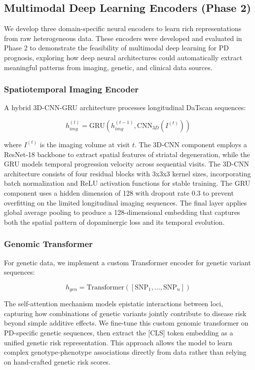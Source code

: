 \documentclass[journal,twoside,web]{ieeecolor}
\begin{document}
\subsection{Multimodal Deep Learning Encoders (Phase 2)}

We develop three domain-specific neural encoders to learn rich representations from raw heterogeneous data. These encoders were developed and evaluated in Phase 2 to demonstrate the feasibility of multimodal deep learning for PD prognosis, exploring how deep neural architectures could automatically extract meaningful patterns from imaging, genetic, and clinical data sources.

\subsubsection{Spatiotemporal Imaging Encoder}
A hybrid 3D-CNN-GRU architecture processes longitudinal DaTscan sequences:

\begin{equation}
h_{img}^{(t)} = \text{GRU}(h_{img}^{(t-1)}, \text{CNN}_{3D}(I^{(t)}))
\end{equation}

where $I^{(t)}$ is the imaging volume at visit $t$. The 3D-CNN component employs a ResNet-18 backbone to extract spatial features of striatal degeneration, while the GRU models temporal progression velocity across sequential visits. The 3D-CNN architecture consists of four residual blocks with 3x3x3 kernel sizes, incorporating batch normalization and ReLU activation functions for stable training. The GRU component uses a hidden dimension of 128 with dropout rate 0.3 to prevent overfitting on the limited longitudinal imaging sequences. The final layer applies global average pooling to produce a 128-dimensional embedding that captures both the spatial pattern of dopaminergic loss and its temporal evolution.

\subsubsection{Genomic Transformer}
For genetic data, we implement a custom Transformer encoder for genetic variant sequences:

\begin{equation}
h_{gen} = \text{Transformer}([\text{SNP}_1, \ldots, \text{SNP}_n])
\end{equation}

The self-attention mechanism models epistatic interactions between loci, capturing how combinations of genetic variants jointly contribute to disease risk beyond simple additive effects. We fine-tune this custom genomic transformer on PD-specific genetic sequences, then extract the [CLS] token embedding as a unified genetic risk representation. This approach allows the model to learn complex genotype-phenotype associations directly from data rather than relying on hand-crafted genetic risk scores.
\end{document}
